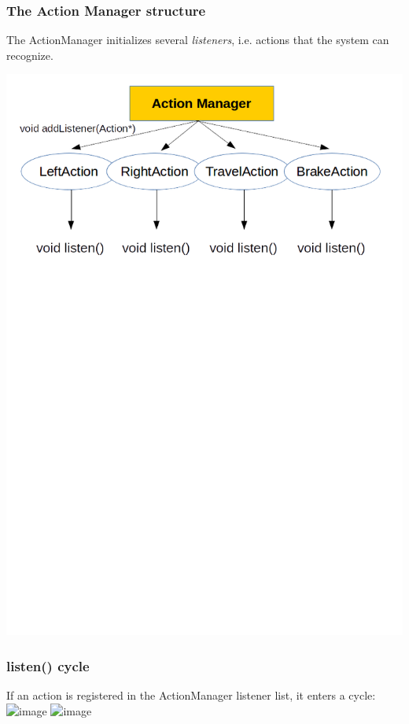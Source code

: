 \documentclass{beamer}
\begin{document}
\begin{frame}
\frametitle{The Action Manager structure}
The ActionManager initializes several \textit{listeners}, i.e. actions that the system can recognize.
\bigskip
\bigskip
\bigskip

\centering
\includegraphics[scale=0.5]{ActionManager}

\end{frame}

\begin{frame}
\frametitle{listen() cycle}
If an action is registered in the ActionManager listener list, it enters a cycle:\\

\centering
\includegraphics<1>[scale=0.6]{ListeningCycle4}
\includegraphics<2>[scale=0.4]{ListeningSignal}


\end{frame}
\end{document}
